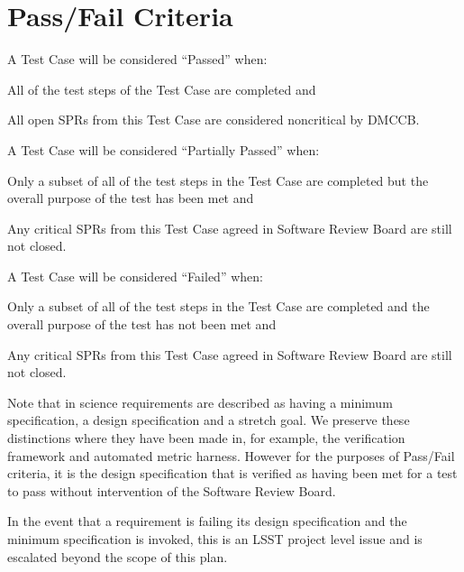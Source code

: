 
\section{Pass/Fail Criteria}


A Test Case will be considered ``Passed'' when:
\begin{itemize_single}
\item All of the test steps of the Test Case are completed and
\item All open SPRs from this Test Case are considered noncritical by DMCCB.
\end{itemize_single}

A Test Case will be considered ``Partially Passed'' when:
\begin{itemize_single}
\item Only a subset of all of the test steps in the Test Case are completed but the overall purpose of the test has been met and
\item Any critical SPRs from this Test Case agreed in Software Review Board are still not closed.
\end{itemize_single}

A Test Case will be considered ``Failed'' when:
\begin{itemize_single}
\item Only a subset of all of the test steps in the Test Case are completed and the overall purpose of the test has not been met and
\item Any critical SPRs from this Test Case agreed in Software Review Board are still not closed.
\end{itemize_single}

Note that in  science requirements are described as having a minimum specification, a design specification and a stretch goal. We preserve these distinctions where they have been made in, for example, the verification framework and automated metric harness. However for the purposes of Pass/Fail criteria, it is the design specification that is verified as having been met for a test to pass without intervention of the Software Review Board.

In the event that a requirement is failing its design specification and the minimum specification is invoked, this is an LSST project level issue and is escalated beyond the scope of this plan. 
